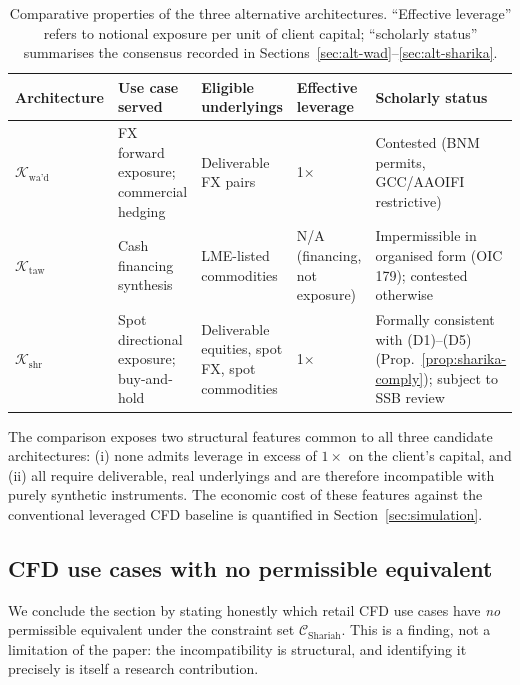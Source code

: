 \documentclass[preprint,12pt,authoryear]{elsarticle}
\newcommand{\CC}{\mathcal{C}}
\theoremstyle{definition}
\begin{document}
\begin{table}[!ht]
\centering
\small
\caption{Comparative properties of the three alternative
architectures. ``Effective leverage'' refers to notional exposure
per unit of client capital; ``scholarly status'' summarises the
consensus recorded in
Sections~\ref{sec:alt-wad}--\ref{sec:alt-sharika}.}
\label{tab:architecture-comparison}
\begin{tabular}{@{}p{2.8cm}p{3.2cm}p{2.6cm}p{2cm}p{2.8cm}@{}}
\toprule
\textbf{Architecture}
    & \textbf{Use case served}
    & \textbf{Eligible underlyings}
    & \textbf{Effective leverage}
    & \textbf{Scholarly status} \\
\midrule
$\mathcal{K}_{\text{wa'd}}$
    & FX forward exposure; commercial hedging
    & Deliverable FX pairs
    & 1$\times$
    & Contested (BNM permits, GCC/AAOIFI restrictive) \\[6pt]
$\mathcal{K}_{\text{taw}}$
    & Cash financing synthesis
    & LME-listed commodities
    & N/A (financing, not exposure)
    & Impermissible in organised form (OIC 179); contested otherwise \\[6pt]
$\mathcal{K}_{\text{shr}}$
    & Spot directional exposure; buy-and-hold
    & Deliverable equities, spot FX, spot commodities
    & 1$\times$
    & Formally consistent with (D1)--(D5)
      (Prop.~\ref{prop:sharika-comply}); subject to SSB review \\
\bottomrule
\end{tabular}
\end{table}

The comparison exposes two structural features common to all three
candidate architectures: (i) none admits leverage in excess of
$1\times$ on the client's capital, and (ii) all require
deliverable, real underlyings and are therefore incompatible with
purely synthetic instruments. The economic cost of these features
against the conventional leveraged CFD baseline is quantified in
Section~\ref{sec:simulation}.

\subsection{CFD use cases with no permissible equivalent}
\label{sec:no-equivalent}

We conclude the section by stating honestly which retail CFD use
cases have \emph{no} permissible equivalent under the constraint
set $\CC_{\text{Shariah}}$. This is a finding, not a limitation of
the paper: the incompatibility is structural, and identifying it
precisely is itself a research contribution.
\end{document}
